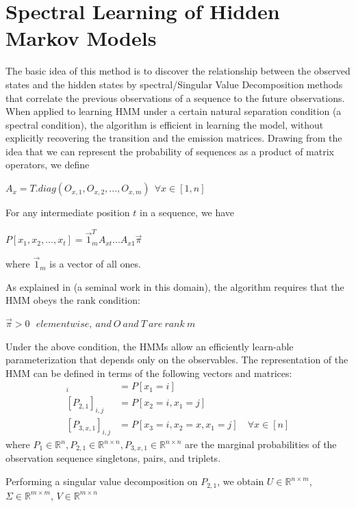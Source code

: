 \documentclass[letterpaper]{article}
\begin{document}
\section{Spectral Learning of Hidden Markov Models}
The basic idea of this method is to discover the relationship between the observed states and the hidden states by spectral/Singular Value Decomposition methods that correlate the previous observations of a sequence to the future observations. When applied to learning HMM under a certain natural separation condition (a spectral condition), the algorithm is efficient in learning the model, without explicitly recovering the transition and the emission matrices.
Drawing from the idea that we can represent the probability of sequences as a product of matrix operators, we define
\begin{center}
	$A_{x} = T.diag(O_{x,1}, O_{x,2}, ... , O_{x,m} )\ \ \forall x \in [1, n]$
\end{center}

For any intermediate position $t$ in a sequence, we have

\begin{center}
	$P[x_{1}, x_{2}, ..., x_{t}] = \vec1_{m}^{T}A_{xt}...A_{x1}\vec\pi$
\end{center}
where $\vec1_{m}$ is a vector of all ones.

As explained in \cite{slhmm}(a seminal work in this domain), the algorithm requires that the HMM obeys the rank condition:
\begin{center}
	$\vec\pi > 0\ \ \ element wise,\ and\ O\ and\ T\ are\ rank\ m$
\end{center}
Under the above condition, the HMMs allow an efficiently learn-able parameterization that depends only on the observables. The representation of the HMM can be defined in terms of the following vectors and matrices:
\begin{align*}
	[P_{1}]_{i}       & = P[x_{1} = i]                                         \\
	[P_{2,1}]_{i,j}   & = P[x_{2}=i, x_{1}=j]                                  \\
	[P_{3,x,1}]_{i,j} & = P[x_{3}=i, x_{2}=x, x_{1}=j] \quad \forall x \in [n] 
\end{align*}
where $P_{1} \in \mathbb{R}^{n}, P_{2,1} \in \mathbb{R}^{n \times n}, P_{3,x,1} \in \mathbb{R}^{n \times n}$ are the marginal probabilities of the observation sequence singletons, pairs, and triplets.

Performing a singular value decomposition on $P_{2,1}$, we obtain $U \in \mathbb{R}^{n \times m}$, $\Sigma \in \mathbb{R}^{m \times m}$, $V \in \mathbb{R}^{m \times n}$
\end{document}
